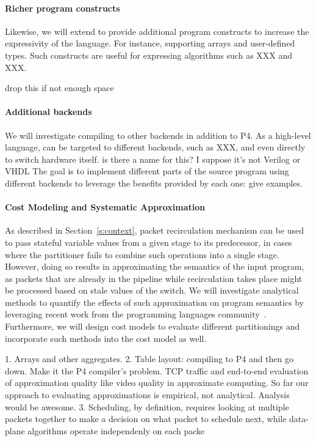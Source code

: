 \paragraph{Richer program constructs}
Likewise, we will extend \pktlanguage to provide additional program constructs
to increase the expressivity of the language. For instance, supporting 
arrays and user-defined types. Such constructs are useful for expressing 
algorithms such as XXX and XXX.

\ac{drop this if not enough space}
\paragraph{Additional backends}
We will investigate compiling \pktlanguage to other backends in addition to P4. 
As a high-level language, \pktlanguage can be targeted to different backends, 
such as XXX, and even directly 
to switch hardware itself. \ac{is there a name for this? I suppose
it's not Verilog or VHDL} The goal is to implement different parts of the source 
program using different backends to leverage the benefits provided by each one:
\ac{give examples}.


\paragraph{Cost Modeling and Systematic Approximation}
As described in Section~\ref{s:context}, 
packet recirculation mechanism can be used to pass stateful variable values  
from a given stage to its predecessor,
in cases where the partitioner fails to combine such
operations into a single stage.
However, doing so results in approximating the semantics of
the input \pktlanguage program, as packets that are already in the pipeline 
while recirculation takes place might be processed based on stale values of the
switch. We will investigate analytical methods to quantify the effects of
such approximation on program semantics by leveraging recent work from
the programming languages community~\cite{sampsonApprox, chisel}. 
Furthermore, we will design cost
models to evaluate different partitionings and incorporate such methods into
the cost model as well. 


1. Arrays and other aggregates.
2. Table layout: compiling to P4 and then go down. Make it the P4 compiler's problem.
TCP traffic and end-to-end evaluation of approximation quality like video quality in approximate computing.
So far our approach to evaluating approximations is empirical, not analytical. Analysis would be awesome.
3. Scheduling, by definition, requires looking at multiple packets together to
make a decision on what packet to schedule next, while data-plane algorithms
operate independenly on each packe
\fi
